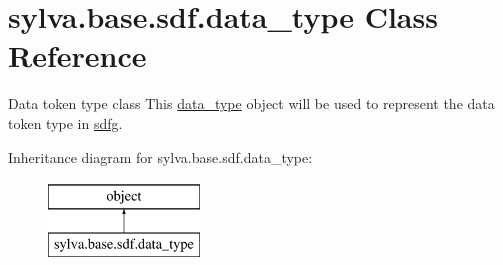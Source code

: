 \hypertarget{classsylva_1_1base_1_1sdf_1_1data__type}{}\section{sylva.\+base.\+sdf.\+data\+\_\+type Class Reference}
\label{classsylva_1_1base_1_1sdf_1_1data__type}


Data token type class This \hyperlink{classsylva_1_1base_1_1sdf_1_1data__type}{data\+\_\+type} object will be used to represent the data token type in \hyperlink{classsylva_1_1base_1_1sdf_1_1sdfg}{sdfg}.  


Inheritance diagram for sylva.\+base.\+sdf.\+data\+\_\+type\+:\begin{figure}[H]
\begin{center}
\leavevmode
\includegraphics[height=2.000000cm]{classsylva_1_1base_1_1sdf_1_1data__type}
\end{center}
\end{figure}
